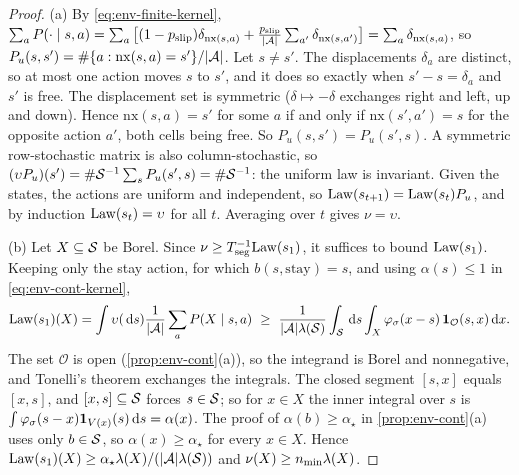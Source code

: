 \begin{proof}
(a) By \eqref{eq:env-finite-kernel}, $\sum_aP(\cdot\mid s,a)=\sum_a\big[(1-p_{\mathrm{slip}})\delta_{\mathrm{nx}(s,a)}+\frac{p_{\mathrm{slip}}}{\lvert\mathcal{A}\rvert}\sum_{a'}\delta_{\mathrm{nx}(s,a')}\big]=\sum_a\delta_{\mathrm{nx}(s,a)}$, so $P_u(s,s')=\#\{a:\mathrm{nx}(s,a)=s'\}/\lvert\mathcal{A}\rvert$.
Let $s\ne s'$. The displacements $\delta_a$ are distinct, so at most one action moves $s$ to $s'$, and it does so exactly when $s'-s=\delta_a$ and $s'$ is free.
The displacement set is symmetric ($\delta\mapsto-\delta$ exchanges right and left, up and down). Hence $\mathrm{nx}(s,a)=s'$ for some $a$ if and only if $\mathrm{nx}(s',a')=s$ for the opposite action $a'$, both cells being free. So $P_u(s,s')=P_u(s',s)$.
A symmetric row-stochastic matrix is also column-stochastic, so $(\upsilon P_u)(s')=\#\mathcal{S}^{-1}\sum_sP_u(s',s)=\#\mathcal{S}^{-1}$: the uniform law is invariant.
Given the states, the actions are uniform and independent, so $\mathrm{Law}(s_{t+1})=\mathrm{Law}(s_t)P_u$, and by induction $\mathrm{Law}(s_t)=\upsilon$ for all $t$. Averaging over $t$ gives $\nu=\upsilon$.

(b) Let $X\subseteq\mathcal{S}$ be Borel. Since $\nu\ge T_{\mathrm{seg}}^{-1}\mathrm{Law}(s_1)$, it suffices to bound $\mathrm{Law}(s_1)$.
Keeping only the stay action, for which $b(s,\mathrm{stay})=s$, and using $\alpha(s)\le1$ in \eqref{eq:env-cont-kernel},
\[
\law(s_1)(X)=\int\upsilon(\dd s)\frac1{\lvert\cA\rvert}\sum_aP(X\mid s,a)\ \ge\ \frac1{\lvert\cA\rvert\Leb(\cS)}\int_\cS\dd s\int_X\varphi_\sigma(x-s)\,\ind_{\mathcal O}(s,x)\dd x .
\]
The set $\mathcal O$ is open (\cref{prop:env-cont}(a)), so the integrand is Borel and nonnegative, and Tonelli's theorem exchanges the integrals.
The closed segment $[s,x]$ equals $[x,s]$, and $[x,s]\subseteq\mathcal{S}$ forces $s\in\mathcal{S}$; so for $x\in X$ the inner integral over $s$ is $\int\varphi_\sigma(s-x)\mathbf{1}_{V(x)}(s)\,\mathrm{d} s=\alpha(x)$.
The proof of $\alpha(b)\ge\alpha_\star$ in \cref{prop:env-cont}(a) uses only $b\in\mathcal{S}$, so $\alpha(x)\ge\alpha_\star$ for every $x\in X$.
Hence $\mathrm{Law}(s_1)(X)\ge\alpha_\star\lambda(X)/(\lvert\mathcal{A}\rvert\lambda(\mathcal{S}))$ and $\nu(X)\ge n_{\min}\lambda(X)$.


\end{proof}
